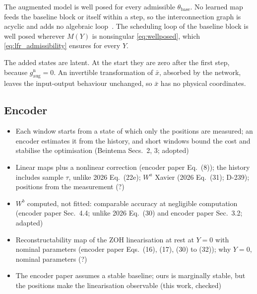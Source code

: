 The augmented model is well posed for every admissible $\theta_{\mathrm{base}}$.
No learned map feeds the baseline block or itself within a step, so the
interconnection graph is acyclic and adds no algebraic
loop~\cite[Thm.~1]{hoekstra2025lfr}.
The scheduling loop of the baseline block is well posed wherever $M(Y)$ is
nonsingular \eqref{eq:wellposed}, which \eqref{eq:lfr_admissibility} ensures
for every $Y$.

The added states are latent.
At the start they are zero after the first step, because
$g^{\mathrm n}_{\mathrm{aug}}=0$.
An invertible transformation of $\bar x$, absorbed by the network, leaves the
input-output behaviour unchanged, so $\bar x$ has no physical coordinates.

\subsection{Encoder}\label{sec:aug_encoder}
\ifdraft
\begin{itemize}
\item Each window starts from a state of which only the positions are measured; an encoder estimates it from the history, and short windows bound the cost and stabilise the optimisation (Beintema Secs.~2, 3; adopted)
\item Linear maps plus a nonlinear correction (encoder paper Eq.~(8)); the history includes sample $\tau$, unlike 2026 Eq.~(22e); $W^a$ Xavier (2026 Eq.~(31); D-239); positions from the measurement (?)
\item $W^b$ computed, not fitted: comparable accuracy at negligible computation (encoder paper Sec.~4.4; unlike 2026 Eq.~(30) and encoder paper Sec.~3.2; adapted)
\item Reconstructability map of the ZOH linearisation at rest at $Y=0$ with nominal parameters (encoder paper Eqs.~(16), (17), (30) to (32)); why $Y=0$, nominal parameters (?)
\item The encoder paper assumes a stable baseline; ours is marginally stable, but the positions make the linearisation observable (this work, checked)
\end{itemize}
\fi

